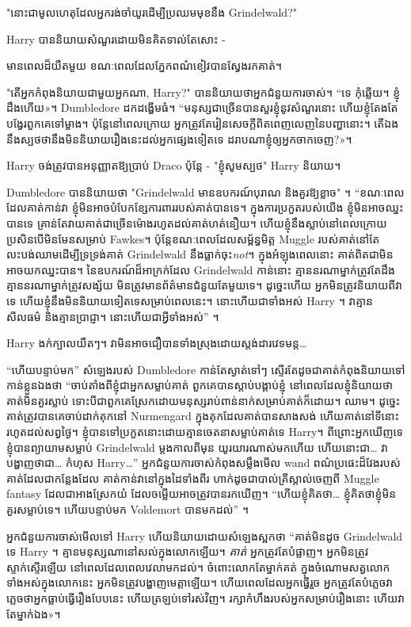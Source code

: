 {{"នោះជាមូលហេតុដែលអ្នករង់ចាំយូរដើម្បីប្រឈមមុខនឹង Grindelwald?"

Harry បាននិយាយសំណួរដោយមិនគិតទាល់តែសោះ -

មានពេលដ៏យឺតមួយ ខណៈពេលដែលភ្នែកពណ៌ខៀវបានស្វែងរកគាត់។

"តើអ្នកកំពុងនិយាយជាមួយអ្នកណា, Harry?" បាននិយាយថាអ្នកជំនួយការចាស់។ “ទេ កុំឆ្លើយ។ ខ្ញុំ​ដឹង​ហើយ»។ Dumbledore ដកដង្ហើមធំ។ “មនុស្សជាច្រើនបានសួរខ្ញុំនូវសំណួរនោះ ហើយខ្ញុំតែងតែបង្វែរពួកគេទៅម្ខាង។ ប៉ុន្តែ​នៅ​ពេល​ក្រោយ អ្នក​ត្រូវ​តែ​រៀន​សេចក្ដី​ពិត​ពេញលេញ​នៃ​បញ្ហា​នោះ។ តើ​ឯង​នឹង​ស្បថ​ថា​នឹង​មិន​និយាយ​រឿង​នេះ​ដល់​អ្នក​ផ្សេង​ទៀត​ទេ ដរាប​ណា​ខ្ញុំ​ឲ្យ​អ្នក​ចាកចេញ?»។

Harry ចង់​ត្រូវ​បាន​អនុញ្ញាត​ឱ្យ​ប្រាប់ Draco ប៉ុន្តែ - "ខ្ញុំ​សូម​ស្បថ" Harry និយាយ។

Dumbledore បាននិយាយថា "Grindelwald មានឧបករណ៍បុរាណ និងគួរឱ្យខ្លាច" ។ “ខណៈពេលដែលគាត់កាន់វា ខ្ញុំមិនអាចបំបែកខ្សែការពាររបស់គាត់បានទេ។ ក្នុង​ការ​ប្រកួត​របស់​យើង ខ្ញុំ​មិន​អាច​ឈ្នះ​បាន​ទេ គ្រាន់​តែ​វាយ​គាត់​ជា​ច្រើន​ម៉ោង​រហូត​ដល់​គាត់​ហត់​នឿយ។ ហើយខ្ញុំនឹងស្លាប់នៅពេលក្រោយ ប្រសិនបើមិនមែនសម្រាប់ Fawkes។ ប៉ុន្តែខណៈពេលដែលសម្ព័ន្ធមិត្ត Muggle របស់គាត់នៅតែលះបង់ឈាមដើម្បីទ្រទ្រង់គាត់ Grindelwald នឹងធ្លាក់ចុះ\emph{not}។ ក្នុងអំឡុងពេលនោះ គាត់ពិតជាមិនអាចយកឈ្នះបាន។ នៃឧបករណ៍ដ៏អាក្រក់ដែល Grindelwald កាន់នោះ គ្មាននរណាម្នាក់ត្រូវតែដឹង គ្មាននរណាម្នាក់ត្រូវសង្ស័យ មិនត្រូវមានព័ត៌មានជំនួយតែមួយទេ។ ដូច្នេះ​ហើយ អ្នក​មិន​ត្រូវ​និយាយ​ពី​វា​ទេ ហើយ​ខ្ញុំ​នឹង​មិន​និយាយ​ទៀត​ទេ​សម្រាប់​ពេល​នេះ។ នោះហើយជាទាំងអស់ Harry ។ វា​គ្មាន​សីលធម៌ និង​គ្មាន​ប្រាជ្ញា។ នោះហើយជាអ្វីទាំងអស់” ។

Harry ងក់ក្បាលយឺតៗ។ វា​មិន​អាច​ជឿ​បាន​ទាំង​ស្រុង​ដោយ​ស្តង់ដារ​វេទមន្ត…

“ហើយបន្ទាប់មក” សំឡេងរបស់ Dumbledore កាន់តែស្ងាត់ទៅៗ ស្ទើរតែដូចជាគាត់កំពុងនិយាយទៅកាន់ខ្លួនឯងថា “ចាប់តាំងពីខ្ញុំជាអ្នកសម្លាប់គាត់ ពួកគេបានស្តាប់បង្គាប់ខ្ញុំ នៅពេលដែលខ្ញុំនិយាយថាគាត់មិនគួរស្លាប់ ទោះបីជាពួកគេស្រែកដោយមនុស្សរាប់ពាន់នាក់សម្រាប់គាត់ក៏ដោយ។ ឈាម។ ដូច្នេះ គាត់​ត្រូវ​បាន​គេ​ចាប់​ដាក់​គុក​នៅ Nurmengard ក្នុង​គុក​ដែល​គាត់​បាន​សាងសង់ ហើយ​គាត់​នៅ​ទីនោះ​រហូត​ដល់​សព្វ​ថ្ងៃ។ ខ្ញុំ​បាន​ទៅ​ប្រកួត​នោះ​ដោយ​គ្មាន​ចេតនា​សម្លាប់​គាត់​ទេ Harry។ ពីព្រោះអ្នកឃើញទេ ខ្ញុំបានព្យាយាមសម្លាប់ Grindelwald ម្តងកាលពីមុន យូរយារណាស់មកហើយ ហើយនោះជា… វាបង្ហាញថាជា… កំហុស Harry…” អ្នកជំនួយការចាស់កំពុងសម្លឹងមើល wand ពណ៌ប្រផេះដ៏វែងរបស់គាត់ដែលជាកន្លែងដែល គាត់កាន់វានៅក្នុងដៃទាំងពីរ ហាក់ដូចជាបាល់គ្រីស្តាល់ចេញពី Muggle fantasy ដែលជាអាងស្រែកយំ ដែលចម្លើយអាចត្រូវបានរកឃើញ។ “ហើយ​ខ្ញុំ​គិត​ថា… ខ្ញុំ​គិត​ថា​ខ្ញុំ​មិន​គួរ​សម្លាប់​ទេ។ ហើយបន្ទាប់មក Voldemort បានមកដល់” ។

អ្នកជំនួយការចាស់មើលទៅ Harry ហើយនិយាយដោយសំឡេងស្អកថា “គាត់មិនដូច Grindelwald ទេ Harry ។ គ្មាន​មនុស្ស​ណា​នៅ​សល់​ក្នុង​លោក​ឡើយ។ \emph{គាត់} អ្នកត្រូវតែបំផ្លាញ។ អ្នកមិនត្រូវស្ទាក់ស្ទើរឡើយ នៅពេលដែលពេលវេលាមកដល់។ ចំពោះលោកតែម្នាក់គត់ ក្នុងចំណោមសត្វលោកទាំងអស់ក្នុងលោកនេះ អ្នកមិនត្រូវបង្ហាញមេត្តាឡើយ។ ហើយ​ពេល​ដែល​អ្នក​ធ្វើ​រួច អ្នក​ត្រូវ​តែ​បំភ្លេច​វា ភ្លេច​ថា​អ្នក​ធ្លាប់​ធ្វើ​រឿង​បែប​នេះ ហើយ​ត្រឡប់​ទៅ​រស់​វិញ។ រក្សា​កំហឹង​របស់​អ្នក​សម្រាប់​រឿង​នោះ ហើយ​វា​តែ​ម្នាក់​ឯង»។

}}
